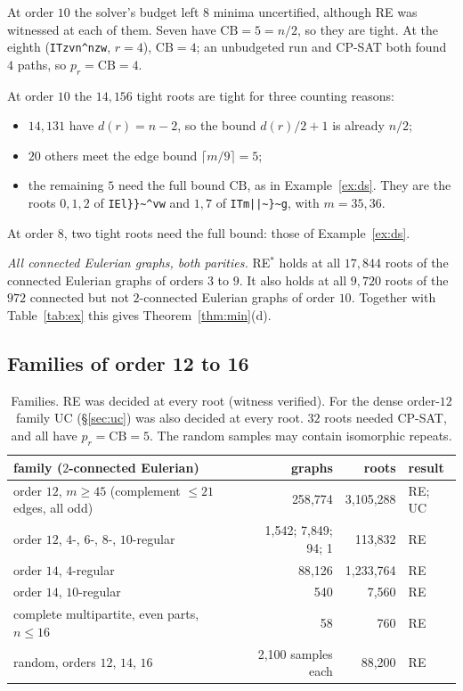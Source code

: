 \documentclass[11pt]{amsart}
\theoremstyle{definition}
\newcommand{\pr}{p_r}
\newcommand{\CB}{\mathrm{CB}}
\begin{document}
At order $10$ the solver's budget left $8$ minima uncertified, although RE was witnessed at each of
them. Seven have $\CB=5=n/2$, so they are tight. At the eighth (\texttt{ITzvn\^{}nzw}, $r=4$),
$\CB=4$; an unbudgeted run and CP-SAT both found $4$ paths, so $\pr=\CB=4$.

At order $10$ the $14{,}156$ tight roots are tight for three counting reasons:
\begin{itemize}[leftmargin=*]
\item $14{,}131$ have $d(r)=n-2$, so the bound $d(r)/2+1$ is already $n/2$;
\item $20$ others meet the edge bound $\lceil m/9\rceil=5$;
\item the remaining $5$ need the full bound $\CB$, as in Example~\ref{ex:ds}. They are the roots
$0,1,2$ of \texttt{IEl\}\}\~{}\^{}vw} and $1,7$ of \texttt{ITm||\~{}\}\~{}g}, with $m=35,36$.
\end{itemize}
At order $8$, two tight roots need the full bound: those of Example~\ref{ex:ds}.

\emph{All connected Eulerian graphs, both parities.} RE$^*$ holds at all $17{,}844$ roots of the
connected Eulerian graphs of orders $3$ to $9$. It also holds at all $9{,}720$ roots of the $972$
connected but not $2$-connected Eulerian graphs of order $10$. Together with Table~\ref{tab:ex} this
gives Theorem~\ref{thm:min}(d).

\subsection{Families of order 12 to 16}
\begin{table}[h]
\begin{tabular}{@{}lrrl@{}}
\toprule
family ($2$-connected Eulerian) & graphs & roots & result\\
\midrule
order $12$, $m\ge45$ (complement $\le21$ edges, all odd) & 258{,}774 & 3{,}105{,}288 & RE; UC \\
order $12$, $4$-, $6$-, $8$-, $10$-regular & 1{,}542; 7{,}849; 94; 1 & 113{,}832 & RE \\
order $14$, $4$-regular & 88{,}126 & 1{,}233{,}764 & RE \\
order $14$, $10$-regular & 540 & 7{,}560 & RE \\
complete multipartite, even parts, $n\le16$ & 58 & 760 & RE \\
random, orders $12$, $14$, $16$ & 2{,}100 samples each & 88{,}200 & RE \\
\bottomrule
\end{tabular}
\caption{Families. RE was decided at every root (witness verified). For the dense order-$12$ family
UC (\S\ref{sec:uc}) was also decided at every root. $32$ roots needed CP-SAT, and all have
$\pr=\CB=5$. The random samples may contain isomorphic repeats.}\label{tab:fam}
\end{table}
\end{document}
